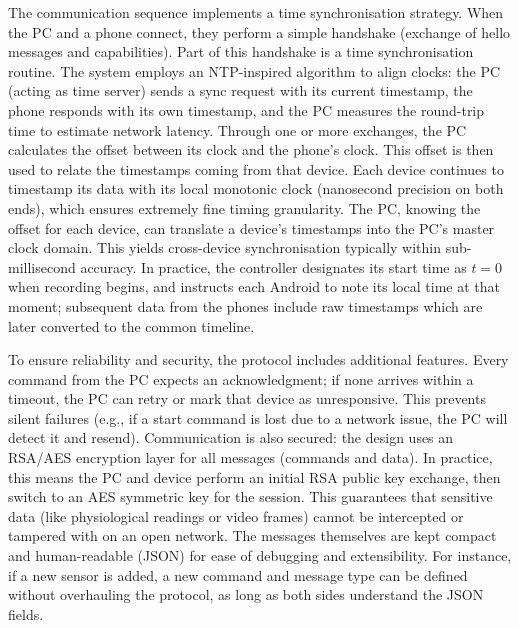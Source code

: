 The communication sequence implements a time synchronisation strategy. When the PC and a phone connect, they perform a simple handshake (exchange of hello messages and capabilities). Part of this handshake is a time synchronisation routine. The system employs an NTP-inspired algorithm to align clocks: the PC (acting as time server) sends a sync request with its current timestamp, the phone responds with its own timestamp, and the PC measures the round-trip time to estimate network latency. Through one or more exchanges, the PC calculates the offset between its clock and the phone's clock. This offset is then used to relate the timestamps coming from that device. Each device continues to timestamp its data with its local monotonic clock (nanosecond precision on both ends), which ensures extremely fine timing granularity. The PC, knowing the offset for each device, can translate a device's timestamps into the PC's master clock domain. This yields cross-device synchronisation typically within sub-millisecond accuracy. In practice, the controller designates its start time as $t = 0$ when recording begins, and instructs each Android to note its local time at that moment; subsequent data from the phones include raw timestamps which are later converted to the common timeline.

To ensure reliability and security, the protocol includes additional features. Every command from the PC expects an acknowledgment; if none arrives within a timeout, the PC can retry or mark that device as unresponsive. This prevents silent failures (e.g., if a start command is lost due to a network issue, the PC will detect it and resend). Communication is also secured: the design uses an RSA/AES encryption layer for all messages (commands and data). In practice, this means the PC and device perform an initial RSA public key exchange, then switch to an AES symmetric key for the session. This guarantees that sensitive data (like physiological readings or video frames) cannot be intercepted or tampered with on an open network. The messages themselves are kept compact and human-readable (JSON) for ease of debugging and extensibility. For instance, if a new sensor is added, a new command and message type can be defined without overhauling the protocol, as long as both sides understand the JSON fields.

